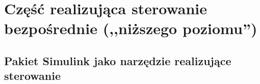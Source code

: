 \section{Część realizująca sterowanie bezpośrednie (,,niższego poziomu'')}
\label{sec:czesc-nizsza}


\subsection{Pakiet Simulink jako narzędzie realizujące sterowanie}
\label{sub:czesc-nizsza-matlab}

\cite{Trawinski2011}
